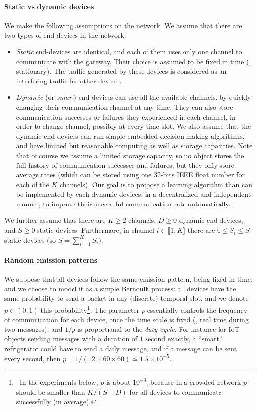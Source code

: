 \paragraph{Static vs dynamic devices}
%
We make the following assumptions on the network.
We assume that there are two types of end-devices in the network:
\begin{itemize}
    \item
    \emph{Static} end-devices are identical, and each of them uses only one channel to communicate with the gateway. Their choice is assumed to be fixed in time (\ie, stationary). The traffic generated by these devices is considered as an interfering traffic for other devices.
    \item
    \emph{Dynamic} (or \emph{smart}) end-devices can use all the available channels, by quickly changing their communication channel at any time. They can also store communication successes or failures they experienced in each channel, in order to change channel, possibly at every time slot.
    We also assume that the dynamic end-devices can run simple embedded decision making algorithms, and have limited but reasonable computing as well as storage capacities.
    Note that of course we assume a limited storage capacity, so no object stores the full history of communication successes and failures, but they only store average rates (which can be stored using one $32$-bits IEEE float number for each of the $K$ channels).
    Our goal is to propose a learning algorithm than can be implemented by each dynamic devices, in a decentralized and independent manner, to improve their successful communication rate automatically.
\end{itemize}

We further assume that there are $K \geq 2$ channels, $D \geq 0$ dynamic end-devices, and $S \geq 0$ static devices.
Furthermore, in channel $i \in \llbracket 1; K \rrbracket$ there are $0 \leq S_i \leq S$ static devices (so $S = \sum_{i=1}^{K} S_i$).


\paragraph{Random emission patterns}
%
We suppose that all devices follow the same emission pattern, being fixed in time, and we choose to model it as a simple Bernoulli process:
all devices have the same probability to send a packet in any (discrete) temporal slot, and we denote $p \in (0, 1)$ this probability\footnote{~In the experiments below, $p$ is about $10^{-3}$, because in a crowded network $p$ should be smaller than $K / (S + D)$ for all devices to communicate successfully (in average).}.
The parameter $p$ essentially controls the frequency of communication for each device, once the time scale is fixed (\ie, real time during two messages), and $1/p$ is proportional to the \emph{duty cycle}.
For instance for IoT objects sending messages with a duration of $1$ second exactly, a ``smart'' refrigerator could have to send a daily message, and if a message can be sent every second, then $p = 1 / (12 \times 60 \times 60) \simeq 1.5 \times 10^{-5}$.

